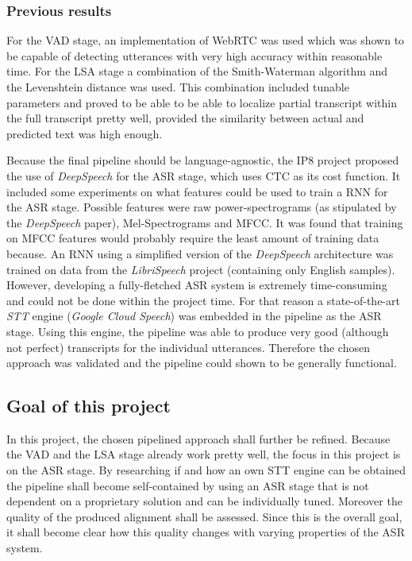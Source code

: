 \subsubsection{Previous results}
For the \ac{VAD} stage, an implementation of WebRTC was used which was shown to be capable of detecting utterances with very high accuracy within reasonable time. For the \ac{LSA} stage a combination of the Smith-Waterman algorithm and the Levenshtein distance was used. This combination included tunable parameters and proved to be able to be able to localize partial transcript within the full transcript pretty well, provided the similarity between actual and predicted text was high enough.

Because the final pipeline should be language-agnostic, the IP8 project proposed the use of \textit{DeepSpeech} for the \ac{ASR} stage, which uses \ac{CTC} \cite{ctc_paper} as its cost function. It included some experiments on what features could be used to train a \ac{RNN} for the \ac{ASR} stage. Possible features were raw power-spectrograms (as stipulated by the \textit{DeepSpeech} paper), Mel-Spectrograms and \ac{MFCC}. It was found that training on \ac{MFCC} features would probably require the least amount of training data because. An \ac{RNN} using a simplified version of the \textit{DeepSpeech} architecture was trained on data from the \textit{LibriSpeech} project (containing only English samples). However, developing a fully-fletched ASR system is extremely time-consuming and could not be done within the project time. For that reason a state-of-the-art \textit{\ac{STT}} engine (\textit{Google Cloud Speech}) was embedded in the pipeline as the \ac{ASR} stage. Using this engine, the pipeline was able to produce very good (although not perfect) transcripts for the individual utterances. Therefore the chosen approach was validated and the pipeline could shown to be generally functional.

\subsection{Goal of this project}

In this project, the chosen pipelined approach shall further be refined. Because the VAD and the \ac{LSA} stage already work pretty well, the focus in this project is on the \ac{ASR} stage. By researching if and how an own \ac{STT} engine can be obtained the pipeline shall become self-contained by using an \ac{ASR} stage that is not dependent on a proprietary solution and can be individually tuned. Moreover the quality of the produced alignment shall be assessed. Since this is the overall goal, it shall become clear how this quality changes with varying properties of the \ac{ASR} system.

